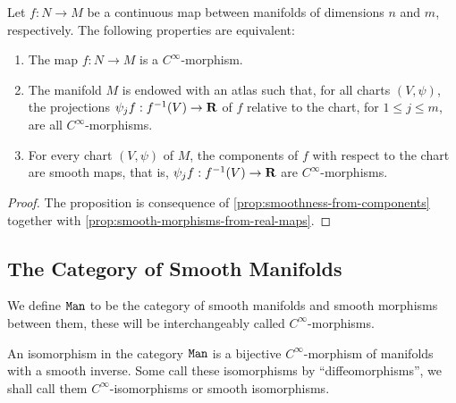 \begin{corollary}
    \label{prop:smoothness-from-components-manifolds}
    Let \(f: N \to M\) be a continuous map between manifolds of dimensions \(n\) and
    \(m\), respectively. The following properties are equivalent:
    \begin{enumerate}\setlength\itemsep{0em}
        \item The map \(f: N \to M\) is a \(C^{\infty}\)-morphism.

        \item The manifold \(M\) is endowed with an atlas such that, for all charts
              \((V, \psi)\), the projections \(\psi_j f: f^{-1}(V) \to \mathbf{R}\) of \(f\)
              relative to the chart, for \(1 \leq j \leq m\), are all
              \(C^{\infty}\)-morphisms.

        \item For every chart \((V, \psi)\) of \(M\), the components of \(f\) with
              respect to the chart are smooth maps, that is, \(\psi_j f: f^{-1}(V) \to \mathbf{R}\)
              are \(C^{\infty}\)-morphisms.
    \end{enumerate}
\end{corollary}

\begin{proof}
    The proposition is consequence of \cref{prop:smoothness-from-components}
    together with \cref{prop:smooth-morphisms-from-real-maps}.
\end{proof}

\subsection{The Category of Smooth Manifolds}

\begin{definition}
    \label{def:smooth-manifolds-category}
    We define \({\texttt{Man}}\) to be the category of smooth manifolds and smooth morphisms
    between them, these will be interchangeably called \(C^{\infty}\)-morphisms.
\end{definition}

\begin{corollary}
    \label{cor:isomorphism-man}
    An isomorphism in the category \({\texttt{Man}}\) is a bijective \(C^{\infty}\)-morphism
    of manifolds with a smooth inverse. Some call these isomorphisms by
    ``diffeomorphisms'', we shall call them \(C^{\infty}\)-isomorphisms or smooth
    isomorphisms.
\end{corollary}

